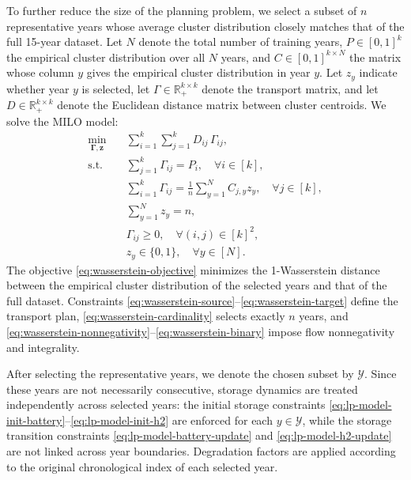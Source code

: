 \documentclass[11pt, letter]{article}
\begin{document}
To further reduce the size of the planning problem, we select a subset of $n$ representative years whose average cluster distribution closely matches that of the full 15-year dataset. Let $N$ denote the total number of training years, $P \in [0,1]^k$ the empirical cluster distribution over all $N$ years, and $C \in [0,1]^{k \times N}$ the matrix whose column $y$ gives the empirical cluster distribution in year $y$. Let $z_y$ indicate whether year $y$ is selected, let $\Gamma \in \mathbb{R}_+^{k \times k}$ denote the transport matrix, and let $D \in \mathbb{R}_+^{k \times k}$ denote the Euclidean distance matrix between cluster centroids. We solve the MILO model:
\begin{subequations}\label{eq:wasserstein}
\begin{align}
\min_{\boldsymbol \Gamma, \boldsymbol{z}}  \quad & \sum_{i=1}^k \sum_{j=1}^k D_{ij} \, \Gamma_{ij}, \label{eq:wasserstein-objective} \\
\text{s.t.} \quad 
& \sum_{j=1}^k \Gamma_{ij} = P_i, \quad \forall i \in [k], \label{eq:wasserstein-source} \\
& \sum_{i=1}^k \Gamma_{ij} = \frac{1}{n} \sum_{y=1}^N C_{j,y} z_y, \quad \forall j \in [k], \label{eq:wasserstein-target} \\
& \sum_{y=1}^N z_y = n, \label{eq:wasserstein-cardinality} \\
& \Gamma_{ij} \ge 0, \quad \forall (i,j) \in [k]^2, \label{eq:wasserstein-nonnegativity} \\
& z_y \in \{0,1\}, \quad \forall y \in [N]. \label{eq:wasserstein-binary}
\end{align}
\end{subequations}
The objective \eqref{eq:wasserstein-objective} minimizes the 1-Wasserstein distance between the empirical cluster distribution of the selected years and that of the full dataset. Constraints \eqref{eq:wasserstein-source}--\eqref{eq:wasserstein-target} define the transport plan, \eqref{eq:wasserstein-cardinality} selects exactly $n$ years, and \eqref{eq:wasserstein-nonnegativity}--\eqref{eq:wasserstein-binary} impose flow nonnegativity and integrality.

After selecting the representative years, we denote the chosen subset by $\mathcal{Y}$. Since these years are not necessarily consecutive, storage dynamics are treated independently across selected years: the initial storage constraints \eqref{eq:lp-model-init-battery}--\eqref{eq:lp-model-init-h2} are enforced for each $y \in \mathcal{Y}$, while the storage transition constraints \eqref{eq:lp-model-battery-update} and \eqref{eq:lp-model-h2-update} are not linked across year boundaries. Degradation factors are applied according to the original chronological index of each selected year.
\end{document}
